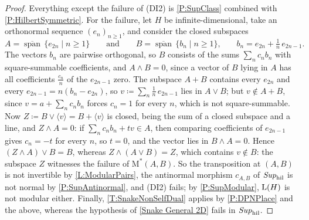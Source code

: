 \begin{proof}
  Everything except the failure of \textup{(DI2)} is \prox\ref{P:SupClass} combined with \prox\ref{P:HilbertSymmetric}. For the failure, let \(H\) be infinite-dimensional, take an orthonormal sequence \((e_{n})_{n\geq1}\), and consider the closed subspaces
	\[
		A=\overline{\operatorname{span}}\,\{e_{2n}\mid n\geq1\}\qquad\text{and}\qquad B=\overline{\operatorname{span}}\,\{b_{n}\mid n\geq1\}\text{,}\qquad b_{n}=e_{2n}+\tfrac{1}{n}\,e_{2n-1}\text{.}
	\]
	The vectors \(b_{n}\) are pairwise orthogonal, so \(B\) consists of the sums \(\sum_{n}c_{n}b_{n}\) with square-summable coefficients, and \(A\wedge B=0\), since a vector of \(B\) lying in \(A\) has all coefficients \(\tfrac{c_{n}}{n}\) of the \(e_{2n-1}\) zero. The subspace \(A+B\) contains every \(e_{2n}\) and every \(e_{2n-1}=n(b_{n}-e_{2n})\), so \(v\coloneq\sum_{n}\tfrac{1}{n}\,e_{2n-1}\) lies in \(A\vee B\); but \(v\notin A+B\), since \(v=a+\sum_{n}c_{n}b_{n}\) forces \(c_{n}=1\) for every \(n\), which is not square-summable. Now \(Z\coloneq B\vee\langle v\rangle=B+\langle v\rangle\) is closed, being the sum of a closed subspace and a line, and \(Z\wedge A=0\): if \(\sum_{n}c_{n}b_{n}+tv\in A\), then comparing coefficients of \(e_{2n-1}\) gives \(c_{n}=-t\) for every \(n\), so \(t=0\), and the vector lies in \(B\wedge A=0\). Hence \((Z\wedge A)\vee B=B\), whereas \(Z\wedge(A\vee B)=Z\), which contains \(v\notin B\): the subspace \(Z\) witnesses the failure of \(\mathrm{M}^{*}(A,B)\). So the transposition at \((A,B)\) is not invertible by \lemx\ref{L:ModularPairs}, the antinormal morphism \(c_{A,B}\) of \(\mathit{Sup}_{\mathrm{hil}}\) is not normal by \prox\ref{P:SupAntinormal}, and \textup{(DI2)} fails; by \prox\ref{P:SupModular}, \(\mathrm{L}(H)\) is not modular either. Finally, \thex\ref{T:SnakeNonSelfDual} applies by \prox\ref{P:DPNPlace} and the above, whereas the hypothesis of \thex\ref{Snake General 2D} fails in \(\mathit{Sup}_{\mathrm{hil}}\).
\end{proof}

